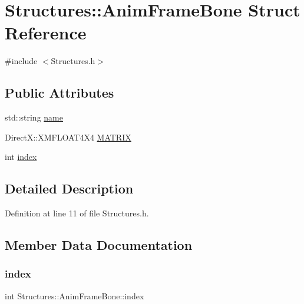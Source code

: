 \hypertarget{struct_structures_1_1_anim_frame_bone}{}\section{Structures\+:\+:Anim\+Frame\+Bone Struct Reference}
\label{struct_structures_1_1_anim_frame_bone}


{\ttfamily \#include $<$Structures.\+h$>$}

\subsection*{Public Attributes}
\begin{DoxyCompactItemize}
\item 
std\+::string \mbox{\hyperlink{struct_structures_1_1_anim_frame_bone_a8a1b25b30ddb0b2a415ae00291d7f7c1}{name}}
\item 
Direct\+X\+::\+X\+M\+F\+L\+O\+A\+T4\+X4 \mbox{\hyperlink{struct_structures_1_1_anim_frame_bone_a43cf9392104548b50bd0e2d68281b674}{M\+A\+T\+R\+IX}}
\item 
int \mbox{\hyperlink{struct_structures_1_1_anim_frame_bone_a238aaccf2dc41849c05da72295dfe2fe}{index}}
\end{DoxyCompactItemize}


\subsection{Detailed Description}


Definition at line 11 of file Structures.\+h.



\subsection{Member Data Documentation}
\mbox{\label{struct_structures_1_1_anim_frame_bone_a238aaccf2dc41849c05da72295dfe2fe}} 
\subsubsection{\texorpdfstring{index}{index}}
{\footnotesize\ttfamily int Structures\+::\+Anim\+Frame\+Bone\+::index}



